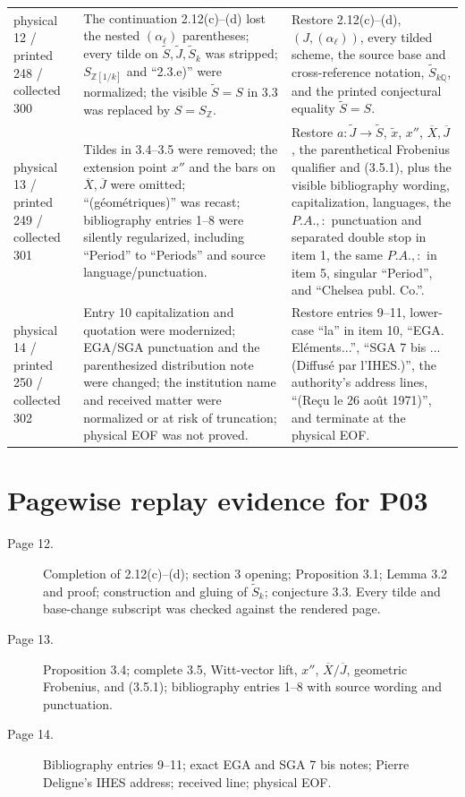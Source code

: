 \documentclass[10pt]{article}
\newcommand{\Q}{\mathbb Q}
\newcommand{\Z}{\mathbb Z}
\begin{document}
\begin{longtable}{>{\raggedright\arraybackslash}p{.19\linewidth}>{\raggedright\arraybackslash}p{.35\linewidth}>{\raggedright\arraybackslash}p{.38\linewidth}}
physical 12 / printed 248 / collected 300 & The continuation 2.12(c)--(d) lost the nested $(\alpha_\ell)$ parentheses; every tilde on $\widetilde S,\widetilde J,\widetilde S_k$ was stripped; $S_{\Z[1/k]}$ and ``2.3.e)'' were normalized; the visible $\widetilde S=S$ in 3.3 was replaced by $S=S_\Z$. & Restore 2.12(c)--(d), $(J,(\alpha_\ell))$, every tilded scheme, the source base and cross-reference notation, $\widetilde S_{k\Q}$, and the printed conjectural equality $\widetilde S=S$.\\
physical 13 / printed 249 / collected 301 & Tildes in 3.4--3.5 were removed; the extension point $x''$ and the bars on $\overline X,\overline J$ were omitted; ``(géométriques)'' was recast; bibliography entries 1--8 were silently regularized, including ``Period'' to ``Periods'' and source language/punctuation. & Restore $a:\widetilde J\to\widetilde S$, $\widetilde x$, $x''$, $\overline X,\overline J$, the parenthetical Frobenius qualifier and (3.5.1), plus the visible bibliography wording, capitalization, languages, the $P.A.,:$ punctuation and separated double stop in item 1, the same $P.A.,:$ in item 5, singular ``Period'', and ``Chelsea publ. Co.''.\\
physical 14 / printed 250 / collected 302 & Entry 10 capitalization and quotation were modernized; EGA/SGA punctuation and the parenthesized distribution note were changed; the institution name and received matter were normalized or at risk of truncation; physical EOF was not proved. & Restore entries 9--11, lower-case ``la'' in item 10, ``EGA. Eléments...'', ``SGA 7 bis ... (Diffusé par l'IHES.)'', the authority's address lines, ``(Reçu le 26 août 1971)'', and terminate at the physical EOF.\\
\end{longtable}
\normalsize

\section*{Pagewise replay evidence for P03}
\begin{description}
\item[Page 12.] Completion of 2.12(c)--(d); section 3 opening; Proposition 3.1; Lemma 3.2 and proof; construction and gluing of $\widetilde S_k$; conjecture 3.3. Every tilde and base-change subscript was checked against the rendered page.
\item[Page 13.] Proposition 3.4; complete 3.5, Witt-vector lift, $x''$, $\overline X/\overline J$, geometric Frobenius, and (3.5.1); bibliography entries 1--8 with source wording and punctuation.
\item[Page 14.] Bibliography entries 9--11; exact EGA and SGA 7 bis notes; Pierre Deligne's IHES address; received line; physical EOF.
\end{description}
\end{document}
